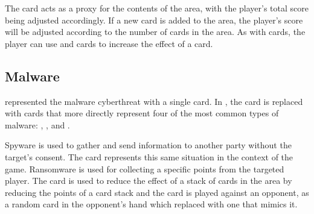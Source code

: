 The \M card acts as a proxy for the contents of the \MS area, with the player's total score being adjusted accordingly. If a new card is added to the \MS area, the player's score will be adjusted according to the number of \M cards in the \Play area.
As with \I cards, the player can use \R and \V cards to increase the effect of a \M card. 

\subsection{Malware}
\label{section:malware}

\pwOne represented the malware cyberthreat with a single \Mal card. In \pwThree, the \Mal card is replaced with cards that more directly represent four of the most common types of malware: \Spyns, \Ranns, \Vi and \Trjns. 

Spyware is used to gather and send information to another party without the target’s consent. The \Spy card represents this same situation in the context of the game. Ransomware is used for collecting a specific points from the targeted player. The \Vi card is used to reduce the effect of a stack of cards in the \Play area by reducing the points of a card stack and the \Trj card is played against an opponent, as a random card in the opponent's hand which replaced with one that mimics it.

